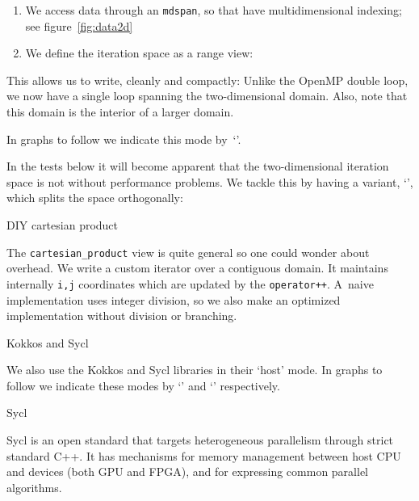   
\begin{enumerate}
\item We access data through an \lstinline{mdspan}, so that have multidimensional indexing;
  see figure~\ref{fig:data2d}

\begin{figure*}[h]
  \caption{Use of \texttt{mdspan} for 2D data access}
  \label{fig:data2d}
\end{figure*}

\item We define the iteration space as a  range view:


\end{enumerate}
This allows us to write, cleanly and compactly:
%
%
Unlike the OpenMP double loop, we now have a single loop
spanning the two-dimensional domain.
Also, note that this domain is the interior of a larger domain.

In graphs to follow we indicate this mode by~`'.

In the tests below it will become apparent that the two-dimensional
iteration space is not without performance problems.
We tackle this by having a variant, `',
which splits the space orthogonally:
%

 {DIY cartesian product}

The \lstinline{cartesian_product} view is quite general
so one could wonder about overhead.
We write a custom iterator over a contiguous domain.
It maintains internally \lstinline{i,j} coordinates
which are updated by the \lstinline{operator++}.
A~naive implementation uses integer division, so we also
make an optimized implementation without division or branching.
%

 {Kokkos and Sycl}

We also use the Kokkos and Sycl libraries in their `host' mode.
In graphs to follow we indicate these modes
by `' and `' respectively.

 {Sycl}

Sycl is an open standard that targets
heterogeneous parallelism through strict standard C++.
It has mechanisms for memory management between host CPU
and devices (both GPU and FPGA),
and for expressing common parallel algorithms.

